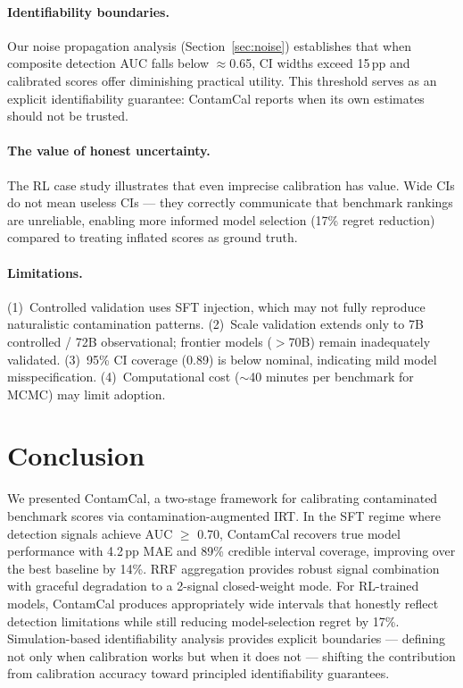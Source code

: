 \documentclass[letterpaper,11pt]{article}
\begin{document}
\paragraph{Identifiability boundaries.}
Our noise propagation analysis (Section~\ref{sec:noise}) establishes that when composite detection AUC falls below $\approx$0.65, CI widths exceed 15\,pp and calibrated scores offer diminishing practical utility. This threshold serves as an explicit identifiability guarantee: ContamCal reports when its own estimates should not be trusted.

\paragraph{The value of honest uncertainty.}
The RL case study illustrates that even imprecise calibration has value. Wide CIs do not mean useless CIs --- they correctly communicate that benchmark rankings are unreliable, enabling more informed model selection (17\% regret reduction) compared to treating inflated scores as ground truth.

\paragraph{Limitations.}
(1)~Controlled validation uses SFT injection, which may not fully reproduce naturalistic contamination patterns.
(2)~Scale validation extends only to 7B controlled / 72B observational; frontier models ($>$70B) remain inadequately validated.
(3)~95\% CI coverage (0.89) is below nominal, indicating mild model misspecification.
(4)~Computational cost ($\sim$40 minutes per benchmark for MCMC) may limit adoption.

\section{Conclusion}

We presented ContamCal, a two-stage framework for calibrating contaminated benchmark scores via contamination-augmented IRT. In the SFT regime where detection signals achieve AUC $\geq$ 0.70, ContamCal recovers true model performance with 4.2\,pp MAE and 89\% credible interval coverage, improving over the best baseline by 14\%. RRF aggregation provides robust signal combination with graceful degradation to a 2-signal closed-weight mode. For RL-trained models, ContamCal produces appropriately wide intervals that honestly reflect detection limitations while still reducing model-selection regret by 17\%. Simulation-based identifiability analysis provides explicit boundaries --- defining not only when calibration works but when it does not --- shifting the contribution from calibration accuracy toward principled identifiability guarantees.
\end{document}
